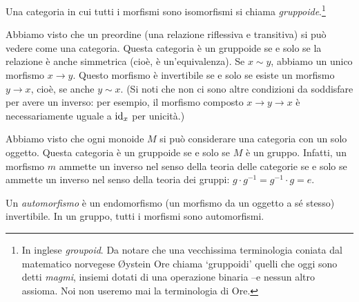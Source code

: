 
\begin{definition}[Gruppoide]\label{def_gruppoide}
	Una categoria in cui tutti i morfismi sono isomorfismi si chiama \emph{gruppoide}.\footnote{In inglese \emph{groupoid}. Da notare che una vecchissima terminologia coniata dal matematico norvegese Øystein Ore chiama `gruppoidi' quelli che oggi sono detti \emph{magmi}, insiemi dotati di una operazione binaria --e nessun altro assioma. Noi non useremo mai la terminologia di Ore.}
\end{definition}
\begin{example}\label{exa_releq_groupoid}
	Abbiamo visto che un preordine (una relazione riflessiva e transitiva) si può vedere come una categoria. Questa categoria è un gruppoide se e solo se la relazione è anche simmetrica (cioè, è un'equivalenza). Se \(x\sim y\), abbiamo un unico morfismo \(x\to y\). Questo morfismo è invertibile se e solo se esiste un morfismo \(y\to x\), cioè, se anche \(y\sim x\). (Si noti che non ci sono altre condizioni da soddisfare per avere un inverso: per esempio, il morfismo composto \(x\to y\to x\) è necessariamente uguale a \(\mathrm{id}_x\) per unicità.)
\end{example}
\begin{example}\label{exa_grp_groupoid}
	Abbiamo visto che ogni monoide \(M\) si può considerare una categoria con un solo oggetto. Questa categoria è un gruppoide se e solo se \(M\) è un gruppo. Infatti, un morfismo \(m\) ammette un inverso nel senso della teoria delle categorie se e solo se ammette un inverso nel senso della teoria dei gruppi: \(g\cdot g^{-1}=g^{-1}\cdot g = e\).
\end{example}

Un \emph{automorfismo} è un endomorfismo (un morfismo da un oggetto a sé stesso) invertibile. In un gruppo, tutti i morfismi sono automorfismi.

